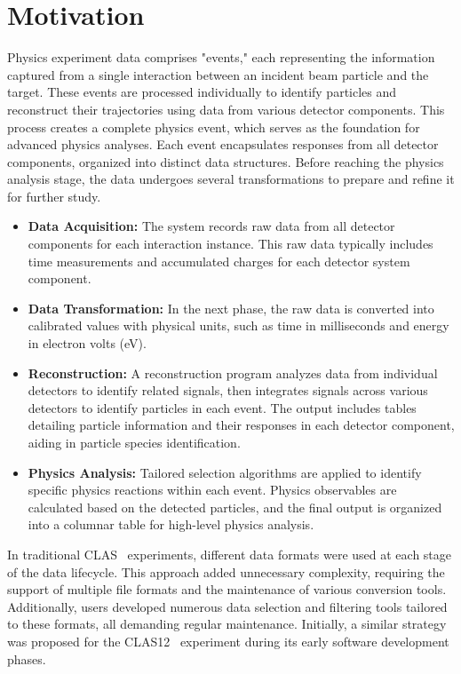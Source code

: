 \documentclass[preprint,12pt]{elsarticle}
\begin{document}
\section{Motivation}
\label{section-motivation}
Physics experiment data comprises "events," each representing the information captured from a single interaction between an incident beam particle and the target. These events are processed individually to identify particles and reconstruct their trajectories using data from various detector components. This process creates a complete physics event, which serves as the foundation for advanced physics analyses. Each event encapsulates responses from all detector components, organized into distinct data structures. Before reaching the physics analysis stage, the data undergoes several transformations to prepare and refine it for further study.
\begin{itemize}
\item {\bf Data Acquisition:} The system records raw data from all detector components for each interaction instance. This raw data typically includes time measurements and accumulated charges for each detector system component.
\item {\bf Data Transformation:} In the next phase, the raw data is converted into calibrated values with physical units, such as time in milliseconds and energy in electron volts (eV).
\item {\bf Reconstruction:} A reconstruction program analyzes data from individual detectors to identify related signals, then integrates signals across various detectors to identify particles in each event. The output includes tables detailing particle information and their responses in each detector component, aiding in particle species identification.
\item {\bf Physics Analysis:} Tailored selection algorithms are applied to identify specific physics reactions within each event. Physics observables are calculated based on the detected particles, and the final output is organized into a columnar table for high-level physics analysis.
\end{itemize}

In traditional CLAS~\cite{CLAS:2003umf} experiments, different data formats were used at each stage of the data lifecycle. This approach added unnecessary complexity, requiring the support of multiple file formats and the maintenance of various conversion tools. Additionally, users developed numerous data selection and filtering tools tailored to these formats, all demanding regular maintenance. Initially, a similar strategy was proposed for the CLAS12~\cite{Burkert:2020akg} experiment during its early software development phases.
\end{document}
